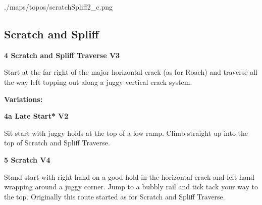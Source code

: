 	\begin{center}
	\begin{overpic}[width=0.9\linewidth]{./maps/topos/scratchSpliff2_c.png}\label{tp:Scratch and Spliff 2}
	\end{overpic}
	\end{center}
	\raggedcolumns
	\begin{multicols}{2}


\needspace{1.5cm}
\subsection*{Scratch and Spliff}\label{bf:Scratch and Spliff}
	


\needspace{1.5cm}
\label{rt:Scratch and Spliff Traverse}
\colorbox{green!20}{
\parbox{0.95\linewidth}{
\textbf{
4 Scratch and Spliff Traverse V3  
}}}

\begin{adjustwidth}{0.5cm}{}			
Start at the far right of the major horizontal crack (as for Roach) and traverse all the way left topping out along a juggy vertical crack system.
\end{adjustwidth}

\begin{adjustwidth}{0.5cm}{}				
\needspace{3cm}
\textbf{Variations:} \newline

\needspace{1.5cm}
\label{vr:Late Start}
\colorbox{green!20}{
\parbox{0.95\linewidth}{
\textbf{
4a Late Start* V2  
}}}

\begin{adjustwidth}{0.5cm}{}			
Sit start with juggy holds at the top of a low ramp. Climb straight up into the top of Scratch and Spliff Traverse.
\end{adjustwidth}


\end{adjustwidth}


\needspace{1.5cm}
\label{rt:Scratch}
\colorbox{RoyalBlue!20}{
\parbox{0.95\linewidth}{
\textbf{
5 Scratch V4  
}}}

\begin{adjustwidth}{0.5cm}{}			
Stand start with right hand on a good hold in the horizontal crack and left hand wrapping around a juggy corner. Jump to a bubbly rail and tick tack your way to the top. Originally this route started as for Scratch and Spliff Traverse.
\end{adjustwidth}



\end{multicols}
